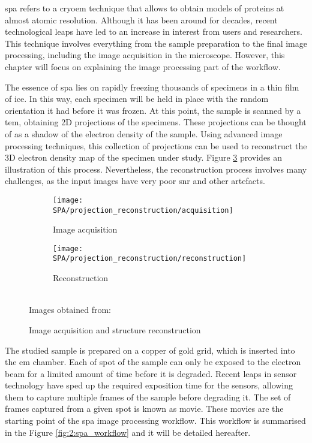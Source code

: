 \documentclass[../main.tex]{subfiles}
\begin{document}
\Gls{spa} refers to a \gls{cryoem} technique that allows to obtain models of proteins at almost atomic resolution. Although it has been around for decades, recent technological leaps have led to an increase in interest from users and researchers. This technique involves everything from the sample preparation to the final image processing, including the image acquisition in the microscope\cite{dimitry2019}. However, this chapter will focus on explaining the image processing part of the workflow.

The essence of \gls{spa} lies on rapidly freezing thousands of specimens in a thin film of ice. In this way, each specimen will be held in place with the random orientation it had before it was frozen. At this point, the sample is scanned by a \gls{tem}, obtaining 2D projections of the specimens. These projections can be thought of as a shadow of the electron density of the sample. Using advanced image processing techniques, this collection of projections can be used to reconstruct the 3D electron density map of the specimen under study. Figure \ref{fig:2:acquisition_reconstruction} provides an illustration of this process. Nevertheless, the reconstruction process involves many challenges, as the input images have very poor \gls{snr} and other artefacts.

\begin{figure}[htbp]
    \centering
    \begin{subfigure}[b]{0.45\textwidth}
         \centering
         \texttt{[image: SPA/projection\_reconstruction/acquisition]}
         \caption{Image acquisition}
         \label{fig:2:projection_reconstruction:acquisition}
    \end{subfigure}
    \hfill
    \begin{subfigure}[b]{0.45\textwidth}
         \centering
         \texttt{[image: SPA/projection\_reconstruction/reconstruction]}
         \caption{Reconstruction}
         \label{fig:2:projection_reconstruction:reconstruction}
    \end{subfigure}\\
    Images obtained from: \cite{greg}
    \caption{Image acquisition and structure reconstruction}
    \label{fig:2:acquisition_reconstruction}
\end{figure}

The studied sample is prepared on a copper of gold grid, which is inserted into the \gls{em} chamber. Each of spot of the sample can only be exposed to the electron beam for a limited amount of time before it is degraded. Recent leaps in sensor technology have sped up the required exposition time for the sensors, allowing them to capture multiple frames of the sample before degrading it. The set of frames captured from a given spot is known as movie. These movies are the starting point of the \gls{spa} image processing workflow. This workflow is summarised in the Figure \ref{fig:2:spa_workflow} and it will be detailed hereafter. 
\end{document}
